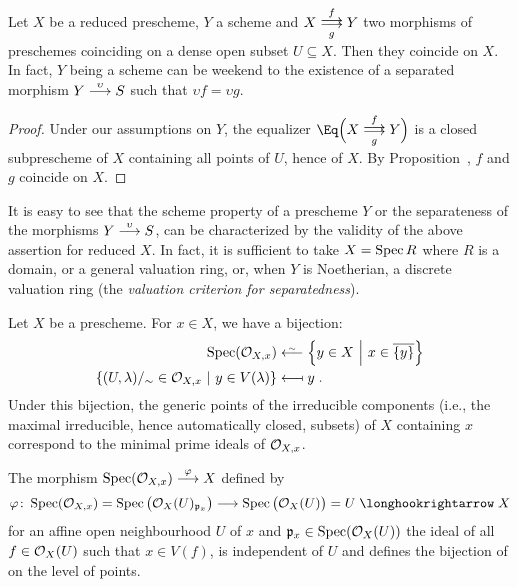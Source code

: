 \documentclass[a4paper,parskip=half,numbers=enddot, DIV=12]{scrreprt}
\begin{document}
\begin{fact}
    Let $X$ be a reduced prescheme, $Y$ a scheme and $X\doublemorphism[f][g] Y$ two morphisms of preschemes coinciding on a dense open subset $U\subseteq X$. Then they coincide on $X$. In fact, $Y$ being a scheme can be weekend to the existence of a separated morphism $Y\morphism[\upsilon] S$ such that $\upsilon f = \upsilon g$.
\end{fact}
\begin{proof}
    Under our assumptions on $Y$, the equalizer $\Eq\Big(X\doublemorphism[f][g] Y\Big)$ is a closed subprescheme of $X$ containing all points of $U$, hence of $X$. By Proposition~, $f$ and $g$ coincide on $X$.
\end{proof}
\begin{rem}
    It is easy to see that the scheme property of a prescheme $Y$ or the separateness of the morphisms $Y\morphism[\upsilon] S$, can be characterized by the validity of the above assertion for reduced $X$. In fact, it is sufficient to take $X=\operatorname{Spec} R$ where $R$ is a domain, or a general valuation ring, or, when $Y$ is Noetherian, a discrete valuation ring (the \emph{valuation criterion for separatedness}).
\end{rem}
\begin{prop}
    \begin{alphanumerate}
    \item{}
        Let $X$ be a prescheme. For $x\in X$, we have a bijection:
        \begin{align*}
            \Spec(\Oo_{X,x}) &\lisomorphism \left\{y\in X\st x\in \ov{\{y\}}\right\}\\
            \left\{(U,\lambda)/_\sim \in \Oo_{X,x}\st y\in V(\lambda)\right\} &\longmapsfrom y\;.
        \end{align*}
        Under this bijection, the generic points of the irreducible components (i.e., the maximal irreducible, hence automatically closed, subsets) of $X$ containing $x$ correspond to the minimal prime ideals of $\mathcal{O}_{X,x}$.
    \item
        The morphism $\Spec (\Oo_{X,x}) \morphism[\phi] X$ defined by 
        \begin{align*}
            \phi\colon\Spec(\Oo_{X,x} ) = \Spec\big(\Oo_X(U)_{\pp_x}\big) \morphism \Spec\big(\Oo_X(U)\big) = U \monomorphism X
        \end{align*}
        for an affine open neighbourhood $U$ of $x$ and $\mathfrak{p}_x\in \operatorname{Spec}(\mathcal{O}_X(U))$ the ideal of all $f\in \mathcal{O}_X(U)$ such that $x\in V(f)$, is independent of $U$ and defines the bijection of  on the level of points.
    \end{alphanumerate}
\end{prop}
\end{document}
